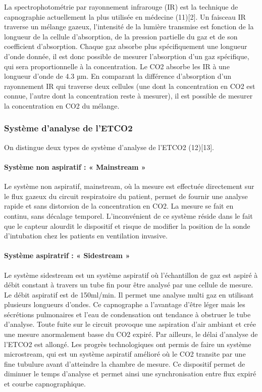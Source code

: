 \documentclass[12pt,]{article}
\let\oldparagraph\paragraph
\renewcommand{\paragraph}[1]{\oldparagraph{#1}\mbox{}}
\begin{document}
La spectrophotométrie par rayonnement infrarouge (IR) est la technique
de capnographie actuellement la plus utilisée en médecine (11){[}2{]}.
Un faisceau IR traverse un mélange gazeux, l'intensité de la lumière
transmise est fonction de la longueur de la cellule d'absorption, de la
pression partielle du gaz et de son coefficient d'absorption. Chaque gaz
absorbe plus spécifiquement une longueur d'onde donnée, il est donc
possible de mesurer l'absorption d'un gaz spécifique, qui sera
proportionnelle à la concentration. Le CO2 absorbe les IR à une longueur
d'onde de 4.3 µm. En comparant la différence d'absorption d'un
rayonnement IR qui traverse deux cellules (une dont la concentration en
CO2 est connue, l'autre dont la concentration reste à mesurer), il est
possible de mesurer la concentration en CO2 du mélange.

\subsubsection{Système d'analyse de
l'ETCO2}\label{systeme-danalyse-de-letco2}

On distingue deux types de système d'analyse de l'ETCO2 (12){[}13{]}.

\paragraph{Système non aspiratif : « Mainstream
»}\label{systeme-non-aspiratif-mainstream}

Le système non aspiratif, mainstream, où la mesure est effectuée
directement sur le flux gazeux du circuit respiratoire du patient,
permet de fournir une analyse rapide et sans distorsion de la
concentration en CO2. La mesure se fait en continu, sans décalage
temporel. L'inconvénient de ce système réside dans le fait que le
capteur alourdit le dispositif et risque de modifier la position de la
sonde d'intubation chez les patients en ventilation invasive.

\paragraph{Système aspiratrif : « Sidestream
»}\label{systeme-aspiratrif-sidestream}

Le système sidestream est un système aspiratif où l'échantillon de gaz
est aspiré à débit constant à travers un tube fin pour être analysé par
une cellule de mesure. Le débit aspiratif est de 150ml/min. Il permet
une analyse multi gaz en utilisant plusieurs longueurs d'ondes. Ce
capnographe a l'avantage d'être léger mais les sécrétions pulmonaires et
l'eau de condensation ont tendance à obstruer le tube d'analyse. Toute
fuite sur le circuit provoque une aspiration d'air ambiant et crée une
mesure anormalement basse du CO2 expiré. Par ailleurs, le délai
d'analyse de l'ETCO2 est allongé. Les progrès technologiques ont permis
de faire un système microstream, qui est un système aspiratif amélioré
où le CO2 transite par une fine tubulure avant d'atteindre la chambre de
mesure. Ce dispositif permet de diminuer le temps d'analyse et permet
ainsi une synchronisation entre flux expiré et courbe capnographique.
\end{document}
